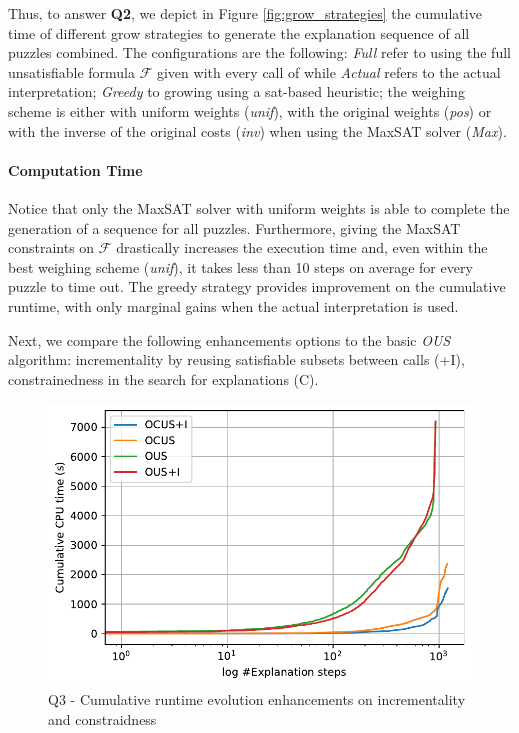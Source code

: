 Thus, to answer \textbf{Q2}, we depict in Figure \ref{fig:grow_strategies} the cumulative time of different grow strategies to generate the explanation sequence of all puzzles combined. The configurations are the following:  \emph{Full} refer to using the full unsatisfiable formula $\mathcal{F}$ given with every call of \comus while \emph{Actual} refers to the actual interpretation; \emph{Greedy} to growing using a sat-based heuristic; the weighing scheme is either with uniform weights (\emph{unif}), with the original weights (\emph{pos}) or with the inverse of the original costs (\emph{inv}) when using the MaxSAT solver (\emph{Max}).

\paragraph{Computation Time} Notice that only the MaxSAT solver with uniform weights is able to complete the generation of a sequence for all puzzles. Furthermore, giving the MaxSAT constraints on $\mathcal{F}$ drastically increases the execution time and, even within the best weighing scheme (\emph{unif}), it takes less than 10 steps on average for every puzzle to time out.
The greedy strategy provides improvement on the cumulative runtime, with only marginal gains when the actual interpretation is used.


Next, we compare the following enhancements options to the basic \emph{OUS} algorithm: incrementality by reusing satisfiable subsets between \omus calls (+I), constrainedness in the search for explanations (C).

\begin{figure}[ht]
  \centering
  \includegraphics[width=\columnwidth]{figures/rq4.pdf}
  \caption{Q3 - Cumulative runtime evolution enhancements on incrementality and constraidness}
  \label{fig:incrementality_constraindness}
\end{figure}

